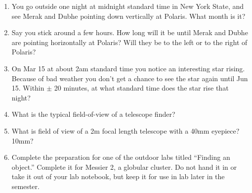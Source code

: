 
\begin{enumerate}
\item You go outside one night at midnight standard time in New York
  State, and see Merak and Dubhe pointing down vertically at
  Polaris. What month is it? 
\vspace{80pt}
\item Say you stick around a few hours.  How long will it be until
  Merak and Dubhe are pointing horizontally at Polaris?  Will they be
  to the left or to the right of Polaris?
\vspace{80pt}
\item On Mar 15 at about 2am standard time you notice an interesting
  star rising.  Because of bad weather you don’t get a chance to see
  the star again until Jun 15.  Within $\pm$ 20 minutes, at what
  standard time does the star rise that night?
\vspace{80pt}
\item What is the typical field-of-view of a telescope finder?
\vspace{80pt}
\item What is field of view of a 2m focal length telescope with a 40mm
  eyepiece? 10mm?
\vspace{80pt}
\item Complete the preparation for one of the outdoor labs titled
  ``Finding an object.'' Complete it for Messier 2, a globular cluster. Do
  not hand it in or take it out of your lab notebook, but keep it for
  use in lab later in the semester.
\end{enumerate}
